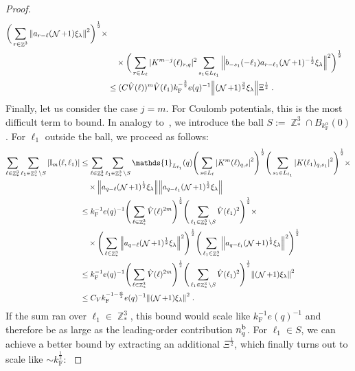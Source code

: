 \documentclass[12pt,a4paper]{article}
\numberwithin{equation}{section}
\newcommand{\1}{\mathbb{I}}
\renewcommand{\b}{\textnormal{b}}
\newcommand{\F}{\mathrm{F}}
\newcommand{\I}{\mathrm{I}}
\DeclareMathOperator{\Z}{\mathbb{Z}}
\DeclareMathOperator{\NN}{\mathcal{N}}
\newcommand{\half}{\frac{1}{2}}
\theoremstyle{plain}
\theoremstyle{definition}
\theoremstyle{remark}
\theoremstyle{plain}
\theoremstyle{definition}
\theoremstyle{remark}
\begin{document}
\begin{proof}
\begin{align}
	\bigg( \sum\limits_{r\in \Z^3} \norm{ a_{r-\ell} (\NN+1) \xi_\lambda}^2\bigg)^\half \times \nonumber\\
		&\quad \times 
	\bigg(\sum\limits_{r\in L_{\ell}} |K^{m-j}(\ell)_{r,q} |^2
		\sum\limits_{s_1 \in L_{\ell_1}}\norm{ b_{-s_1}(-\ell_1) a_{r-\ell_1} (\NN+1)^{-\half}\xi_\lambda }^2\bigg)^\half
	\nonumber\\
	&\leq (C \hat{V}(\ell))^m
		\hat{V}(\ell_1)
		k_{\F}^{-\frac 32} e(q)^{-1}
		\norm{ (\NN+1)^{\frac 32}\xi_\lambda } \Xi^{\half} \;. \label{eq:estEQ2112}
\end{align}
\textcolor{green!30!black}{Finally, let us consider the case $ j = m $. For Coulomb potentials, this is the most difficult term to bound. In analogy to~\cite{CHN24}, we introduce the ball $ S := \Z^3_* \cap B_{k_{\F}^{\alpha}}(0) $. For $ \ell_1 $ outside the ball, we proceed as follows:
\begin{align}
	\sum_{\ell \in \Z^3_*} \sum_{\ell_1 \in \Z^3_* \setminus S} |\I_m(\ell, \ell_1)|
	&\leq \sum_{\ell \in \Z^3_*} \sum_{\ell_1 \in \Z^3_* \setminus S} \mathds{1}_{L_{\ell_1}}(q) \Bigg(\sum\limits_{s \in L_{\ell}} \abs{K^m(\ell)_{q,s}}^2\Bigg)^\half
		\Bigg(\sum\limits_{s_1 \in L_{\ell_1}} \abs{K(\ell_1)_{q,s_1}}^2\Bigg)^\half \times \nonumber \\
	& \quad \times \norm{ a_{q-\ell} (\NN+1)^{\half} \xi_\lambda}
		\norm{ a_{q-\ell_1} (\NN+1)^{\half} \xi_\lambda }\nonumber\\
	&\leq k_{\F}^{-1} e(q)^{-1}
		\Bigg( \sum_{\ell \in \Z^3_*} \hat{V}(\ell)^{2m} \Bigg)^{\half}
		\Bigg( \sum_{\ell_1 \in \Z^3_* \setminus S} \hat{V}(\ell_1)^2 \Bigg)^{\half} \times \nonumber \\
	& \quad \times 
		\Bigg( \sum_{\ell \in \Z^3_*} \norm{ a_{q-\ell} (\NN+1)^{\half} \xi_\lambda}^2 \Bigg)^{\half}
		\Bigg( \sum_{\ell_1 \in \Z^3_*} \norm{ a_{q-\ell_1} (\NN+1)^{\half} \xi_\lambda }^2 \Bigg)^{\half} \nonumber\\
	&\leq k_{\F}^{-1} e(q)^{-1}
		\Bigg( \sum_{\ell \in \Z^3_*} \hat{V}(\ell)^{2m} \Bigg)^{\half}
		\Bigg( \sum_{\ell_1 \in \Z^3_* \setminus S} \hat{V}(\ell_1)^2 \Bigg)^{\half} \norm{(\NN+1) \xi_\lambda}^2 \nonumber\\
	&\leq C_V k_{\F}^{-1-\frac{\alpha}{2}} e(q)^{-1}
		\norm{(\NN+1) \xi_\lambda}^2 \;. \label{eq:estEQ2113_Coulomb_1}
\end{align}
If the sum ran over $ \ell_1 \in \Z^3_* $, this bound would scale like $ k_{\F}^{-1} e(q)^{-1} $ and therefore be as large as the leading-order contribution $ n_q^{\b} $. For $ \ell_1 \in S $, we can achieve a better bound by extracting an additional $ \Xi^{\half} $, which finally turns out to scale like $ \sim k_{\F}^{\half} $:
}
\end{proof}
\end{document}

